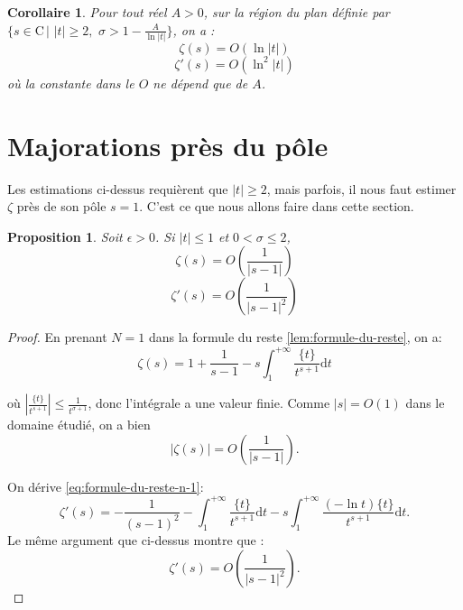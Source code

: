 \documentclass[french]{report}
\newtheorem{proposition}[theorem]{Proposition}
\newtheorem{corollary}[theorem]{Corollaire}
\begin{document}
\begin{corollary}\label{cor:majoration-zeta-et-zeta-prime}
  Pour tout réel $A>0$, sur la région du plan définie par $\{s\in\mathrm{C}\,|\,\,|t|\geq2,\,\,\sigma>1-\frac{A}{\ln |t|}\}$, on a :
  \[ \zeta(s) = O(\ln |t|) \]
  \[ \zeta'(s) = O(\ln^2 |t|) \]
  où la constante dans le $O$ ne dépend que de $A$.
\end{corollary}

\section{Majorations près du pôle}

Les estimations ci-dessus requièrent que $|t|\geq2$, mais parfois, il nous faut estimer $\zeta$ près de son pôle $s=1$. C'est ce que nous allons faire dans cette section.

\begin{proposition}\label{prop:majorations-pres-du-pole}
  Soit $\epsilon>0$. Si $|t|\leq1$ et $0<\sigma\leq2$,
  \[ \zeta(s) = O\left(\frac{1}{|s-1|}\right) \]
  \[ \zeta'(s) = O\left(\frac{1}{|s-1|^2}\right) \]
\end{proposition}

\begin{proof}
  En prenant $N=1$ dans la formule du reste \ref{lem:formule-du-reste}, on a:
  \begin{equation}\label{eq:formule-du-reste-n-1}
    \zeta(s) = 1+\frac{1}{s-1}-s\int_1^{+\infty}\frac{\{t\}}{t^{s+1}}\mathrm{d}t
  \end{equation}

  où $\left|\frac{\{t\}}{t^{s+1}}\right|\leq\frac{1}{t^{\sigma+1}}$, donc l'intégrale a une valeur finie. Comme $|s|=O(1)$ dans le domaine étudié, on a bien
  \[ |\zeta(s)| = O\left(\frac{1}{|s-1|}\right). \]

  On dérive \ref{eq:formule-du-reste-n-1}:
  \[
    \zeta'(s)
    = -\frac{1}{(s-1)^2}
    - \int_1^{+\infty}\frac{\{t\}}{t^{s+1}}\mathrm{d}t
    - s\int_1^{+\infty}\frac{(-\ln t)\{t\}}{t^{s+1}}\mathrm{d}t.
  \]
  Le même argument que ci-dessus montre que :
  \[ \zeta'(s) = O\left(\frac{1}{|s-1|^2}\right). \]
\end{proof}
\end{document}
